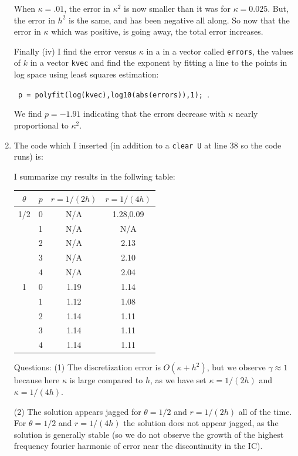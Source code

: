 \documentclass[11pt]{article}
\begin{document}
\begin{enumerate}
When $\kappa = .01$, the error in $\kappa^2$ is now smaller than it was for $\kappa = 0.025$. But, the error in $h^2$ is the same, and has been negative all along. So now that the error in $\kappa$ which was positive, is going away, the total error increases.

Finally (iv) I find the error versus $\kappa$ in a in a vector called \verb|errors|, the values of $k$ in a vector \verb|kvec| and find the exponent by fitting a line to the points in log space using least squares estimation: 

\verb| p = polyfit(log(kvec),log10(abs(errors)),1); |.

We find $p = -1.91$ indicating that the errors decrease with $\kappa$ nearly proportional to $\kappa ^2$.

\item The code which I inserted (in addition to a \verb|clear U| at line 38 so the code runs) is:



I summarize my results in the follwing table:
\begin{table}[h]
  \begin{center}
    \begin{tabular}{cccc}
      \hline
$\theta$ & $p$ & $r = 1/(2h)$ & $r=1/(4h)$ \\
      \hline
      \hline
1/2 & 0  & N/A & 1.28,0.09  \\
     &  1  & N/A & N/A  \\
     &  2  & N/A & 2.13 \\
     &  3  & N/A & 2.10 \\
     &  4  & N/A & 2.04 \\
1 & 0  & 1.19 & 1.14  \\
     &  1  & 1.12 & 1.08  \\
     &  2  & 1.14 & 1.11 \\
     &  3  & 1.14 & 1.11 \\
     &  4  & 1.14 & 1.11 \\
      \hline
    \end{tabular}
  \end{center}
\end{table}

Questions: (1) The discretization error is $O(\kappa + h^2 )$, but we observe $\gamma \approx 1$ because here $\kappa$ is large compared to $h$, as we have set $\kappa = 1/(2h)$ and $\kappa = 1/(4h)$.

(2) The solution appears jagged for $\theta = 1/2$ and $r = 1/(2h)$ all of the time. For $\theta = 1/2$ and $r = 1/(4h)$ the solution does not appear jagged, as the solution is generally stable (so we do not observe the growth of the highest frequency fourier harmonic of error near the discontinuity in the IC).


\end{enumerate}
\end{document}
